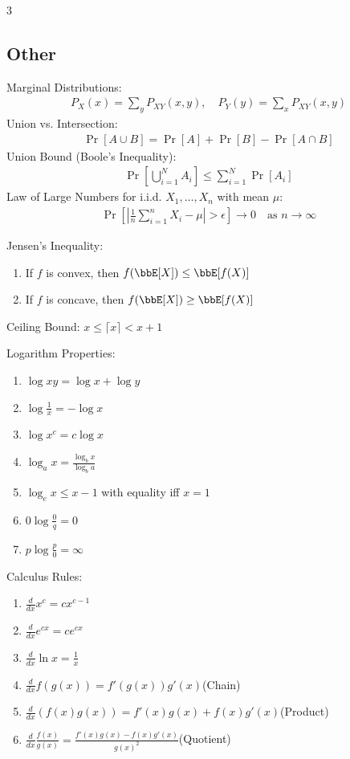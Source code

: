\documentclass[12pt, a4paper]{article}
\begin{document}
\begin{multicols*}{3}
\colbreak
\subsection{Other}
Marginal Distributions:
\begin{align*}
  P_X(x) = \sum_{y} P_{XY}(x,y),\quad P_Y(y) = \sum_{x} P_{XY}(x,y)
\end{align*}
Union vs. Intersection:
\begin{align*}
  \Pr[A \cup B] = \Pr[A] + \Pr[B] - \Pr[A \cap B]
\end{align*}
Union Bound (Boole's Inequality):
\begin{align*}
  \Pr\!\left[\bigcup_{i=1}^{N} A_i\right] \le \sum_{i=1}^{N} \Pr[A_i]
\end{align*}
Law of Large Numbers for i.i.d. $X_1,\dots,X_n$ with mean $\mu$:
\begin{align*}
  \Pr\!\left[\left|\frac{1}{n}\sum_{i=1}^{n} X_i - \mu\right|>\epsilon\right] \to 0
  \quad\text{as } n\to\infty
\end{align*}

Jensen's Inequality:
\begin{enumerate}[\roman*.]
  \item If $f$ is convex, then $f(\E[X]) \le \E[f(X)]$
  \item If $f$ is concave, then $f(\E[X]) \ge \E[f(X)]$
\end{enumerate}

Ceiling Bound: $x \leq \lceil x \rceil < x + 1$

Logarithm Properties:
\begin{enumerate}[\roman*.]
  \item $\log xy = \log x + \log y$
  \item $\log \frac{1}{x} = -\log x$
  \item $\log x^c = c\log x$
  \item $\log_ax = \frac{\log_bx}{\log_ba}$
  \item $\log_ex \leq x - 1$ with equality iff $x=1$
  \item $0\log \frac{0}{q} = 0$
  \item $p\log \frac{p}{0} = \infty$
\end{enumerate}

Calculus Rules:
\begin{enumerate}[\roman*.]
  \item $\frac{d}{dx}x^c= cx^{c-1}$
  \item $\frac{d}{dx}e^{cx} = ce^{cx}$
  \item $\frac{d}{dx}\ln x = \frac{1}{x}$
  \item $\frac{d}{dx} f(g(x)) = f'(g(x))g'(x)$\hfill(Chain) 
  \item $\frac{d}{dx} (f(x)g(x)) = f'(x)g(x) + f(x)g'(x)$\hfill(Product) 
  \item $\frac{d}{dx} \frac{f(x)}{g(x)} = \frac{f'(x)g(x) - f(x)g'(x)}{g(x)^2}$\hfill(Quotient) 
\end{enumerate}
\end{multicols*}
\end{document}

